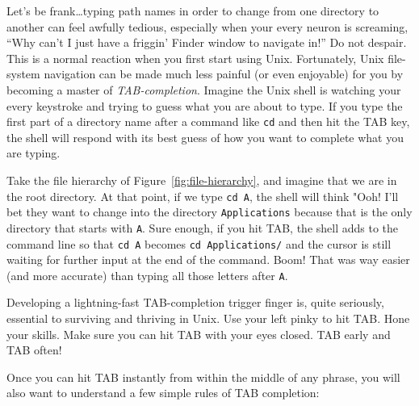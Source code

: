\documentclass[]{krantz}
\begin{document}
Let's be frank\ldots{}typing path names in order to change from one directory to another can feel
awfully tedious, especially when your every neuron is screaming, ``Why can't I just have a friggin' Finder
window to navigate in!'' Do not despair. This is a normal reaction when you first start using Unix.
Fortunately, Unix file-system navigation can be made much less painful (or even enjoyable)
for you by becoming a master of \emph{TAB-completion}. Imagine the Unix shell is watching
your every keystroke and trying to guess what you are about to type. If you type the first part
of a directory name after a command like \texttt{cd} and then hit the TAB key, the shell will respond
with its best guess of how you want to complete what you are typing.

Take the file hierarchy of Figure~\ref{fig:file-hierarchy}, and imagine that we are in the root
directory. At that point, if we type \texttt{cd\ A}, the shell will think "Ooh! I'll bet they want to
change into the directory \texttt{Applications} because that is the only directory that starts with \texttt{A}. Sure enough,
if you hit TAB, the shell adds to the command line so that \texttt{cd\ A} becomes \texttt{cd\ Applications/}
and the cursor is still waiting for further input at the end of the command.
Boom! That was way easier (and more accurate) than typing all those letters after \texttt{A}.

Developing a lightning-fast TAB-completion trigger finger is, quite seriously, essential to surviving and
thriving in Unix. Use your left pinky to hit TAB. Hone your skills. Make sure you can hit TAB with your eyes
closed. TAB early and TAB often!

Once you can hit TAB instantly from within the middle of any phrase, you
will also want to understand a few simple rules of TAB completion:
\end{document}
